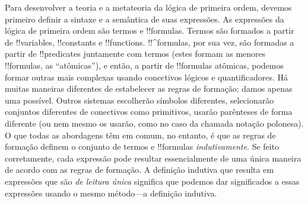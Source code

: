\documentclass[../../../include/open-logic-section]{subfiles}
\begin{document}


Para desenvolver a teoria e a metateoria da lógica de primeira ordem,
devemos primeiro definir a sintaxe e a semântica de suas expressões.  As
expressões da lógica de primeira ordem são termos e !!{formula}s.  Termos
são formados a partir de !!{variable}s, !!{constant}s e !!{function}s.
!!^{formula}s, por sua vez, são formadas a partir de !!{predicate}s juntamente com
termos (estes formam as menores !!{formula}s, as ``atômicas''), e então,
a partir de !!{formula}s atômicas, podemos formar outras mais complexas usando conectivos
lógicos e quantificadores.  Há muitas maneiras diferentes de estabelecer
as regras de formação; damos apenas uma possível. Outros sistemas
escolherão símbolos diferentes, selecionarão conjuntos diferentes de
conectivos como primitivos, usarão parênteses de forma diferente (ou nem mesmo
os usarão, como no caso da chamada notação polonesa).  O que todas as
abordagens têm em comum, no entanto, é que as regras de formação definem
o conjunto de termos e !!{formula}s \emph{indutivamente}. Se feito
corretamente, cada expressão pode resultar essencialmente de uma única maneira
de acordo com as regras de formação.  A definição indutiva que resulta
em expressões que são \emph{de leitura única} significa que podemos dar
significados a essas expressões usando o mesmo método---a definição
indutiva.
\end{document}
